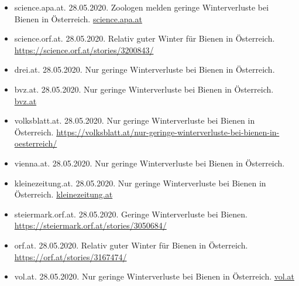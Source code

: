 \begin{itemize}
    \item
    science.apa.at. 28.05.2020. Zoologen melden geringe Winterverluste bei Bienen in Österreich. \href{https://science.apa.at/rubrik/natur_und_technik/Zoologen_melden_geringe_Winterverluste_bei_Bienen_in_Oesterreich/SCI_20200528_SCI39391351454789954}{science.apa.at}
    
    \item
    science.orf.at. 28.05.2020. Relativ guter Winter für Bienen in Österreich. \url{https://science.orf.at/stories/3200843/}
    
    \item
    drei.at. 28.05.2020. Nur geringe Winterverluste bei Bienen in Österreich.  
    
    \item
    bvz.at. 28.05.2020. Nur geringe Winterverluste bei Bienen in Österreich. \href{https://www.bvz.at/in-ausland/uni-graz-erforschte-nur-geringe-winterverluste-bei-bienen-in-oesterreich-oesterreich-agrar-tierkrankheiten-zoologie-oesterreich-207676823}{bvz.at}
    
    \item
    volksblatt.at. 28.05.2020. Nur geringe Winterverluste bei Bienen in Österreich. \url{https://volksblatt.at/nur-geringe-winterverluste-bei-bienen-in-oesterreich/}
    
    \item
    vienna.at. 28.05.2020. Nur geringe Winterverluste bei Bienen in Österreich. 
    
    \item
    kleinezeitung.at. 28.05.2020. Nur geringe Winterverluste bei Bienen in Österreich. \href{https://www.kleinezeitung.at/international/tiere/5819585/Imker-zufrieden_Geringe-Winterverluste-bei-unseren-Bienen}{kleinezeitung.at}
    
    \item
    steiermark.orf.at. 28.05.2020. Geringe Winterverluste bei Bienen. \url{https://steiermark.orf.at/stories/3050684/ }
    
    \item
    orf.at. 28.05.2020. Relativ guter Winter für Bienen in Österreich. 
    \url{https://orf.at/stories/3167474/}
    
    \item
    vol.at. 28.05.2020. Nur geringe Winterverluste bei Bienen in Österreich. \href{https://www.vol.at/nur-geringe-winterverluste-bei-bienen-in-oesterreich/6630935#:~:text=Eine%20gute%20Nachricht%20von%20%C3%96sterreichs,Winter%202019%2F20%20nicht%20%C3%BCberlebt.}{vol.at}
    

\end{itemize}
